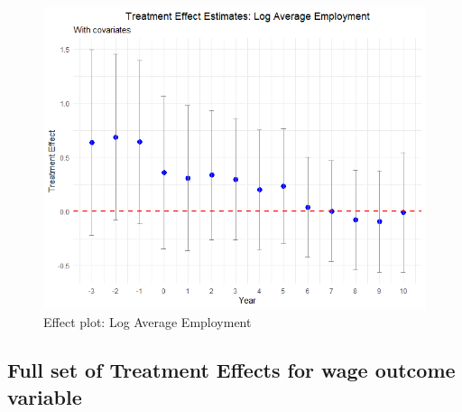 \begin{figure}[htbp]
    \centering
    \includegraphics[width=\textwidth,keepaspectratio]{images/tes_ln_emp.png}
    \caption{Effect plot: Log Average Employment}
    \label{fig:tes_ln_emp}
\end{figure}

\clearpage

\subsection{Full set of Treatment Effects for wage outcome variable}


